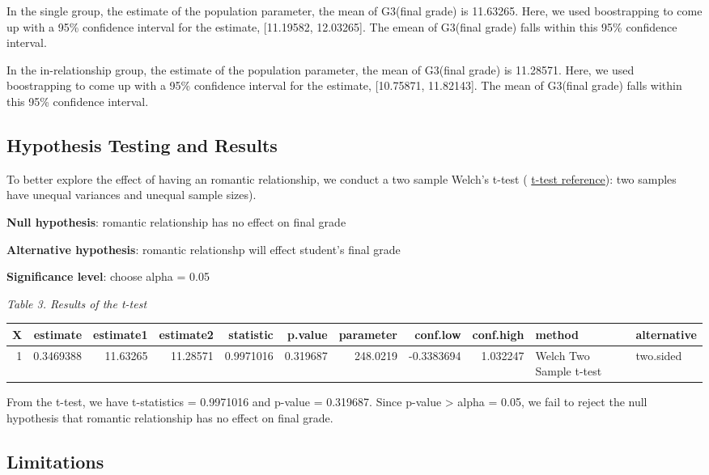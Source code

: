 \documentclass[]{article}
\begin{document}
In the single group, the estimate of the population parameter, the mean
of G3(final grade) is 11.63265. Here, we used boostrapping to come up
with a 95\% confidence interval for the estimate, {[}11.19582,
12.03265{]}. The emean of G3(final grade) falls within this 95\%
confidence interval.

In the in-relationship group, the estimate of the population parameter,
the mean of G3(final grade) is 11.28571. Here, we used boostrapping to
come up with a 95\% confidence interval for the estimate, {[}10.75871,
11.82143{]}. The mean of G3(final grade) falls within this 95\%
confidence interval.

\subsection{Hypothesis Testing and
Results}\label{hypothesis-testing-and-results}

To better explore the effect of having an romantic relationship, we
conduct a two sample Welch's t-test (
\href{https://en.wikipedia.org/wiki/Welch\%27s_t-test}{t-test
reference}): two samples have unequal variances and unequal sample
sizes).

\textbf{Null hypothesis}: romantic relationship has no effect on final
grade

\textbf{Alternative hypothesis}: romantic relationshp will effect
student's final grade

\textbf{Significance level}: choose alpha = 0.05

\emph{Table 3. Results of the t-test}

\begin{longtable}[]{@{}rrrrrrrrrll@{}}
\toprule
X & estimate & estimate1 & estimate2 & statistic & p.value & parameter &
conf.low & conf.high & method & alternative\tabularnewline
\midrule
\endhead
1 & 0.3469388 & 11.63265 & 11.28571 & 0.9971016 & 0.319687 & 248.0219 &
-0.3383694 & 1.032247 & Welch Two Sample t-test &
two.sided\tabularnewline
\bottomrule
\end{longtable}

From the t-test, we have t-statistics = 0.9971016 and p-value =
0.319687. Since p-value \textgreater{} alpha = 0.05, we fail to reject
the null hypothesis that romantic relationship has no effect on final
grade.

\subsection{Limitations}\label{limitations}
\end{document}
